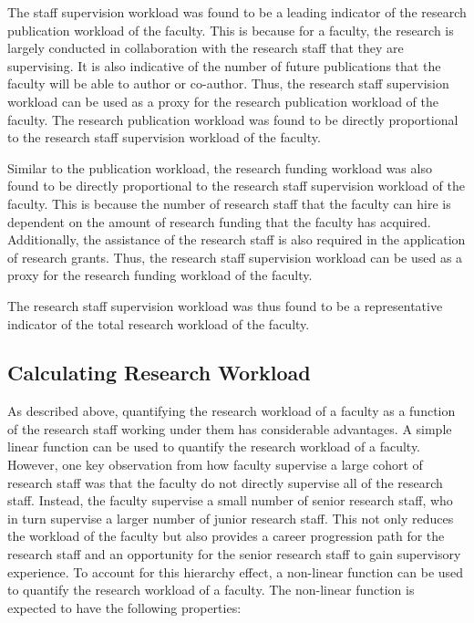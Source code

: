 The staff supervision workload was found to be a leading indicator of the research publication workload of the faculty. This is because for a faculty, the research is largely conducted in collaboration with the research staff that they are supervising. It is also indicative of the number of future publications that the faculty will be able to author or co-author. Thus, the research staff supervision workload can be used as a proxy for the research publication workload of the faculty. The research publication workload was found to be directly proportional to the research staff supervision workload of the faculty.

Similar to the publication workload, the research funding workload was also found to be directly proportional to the research staff supervision workload of the faculty. This is because the number of research staff that the faculty can hire is dependent on the amount of research funding that the faculty has acquired. Additionally, the assistance of the research staff is also required in the application of research grants. Thus, the research staff supervision workload can be used as a proxy for the research funding workload of the faculty.

The research staff supervision workload was thus found to be a representative indicator of the total research workload of the faculty.

\subsection{Calculating Research Workload}
\label{sec:calculating_research_workload}

As described above, quantifying the research workload of a faculty as a function of the research staff working under them has considerable advantages. A simple linear function can be used to quantify the research workload of a faculty. However, one key observation from how faculty supervise a large cohort of research staff was that the faculty do not directly supervise all of the research staff. Instead, the faculty supervise a small number of senior research staff, who in turn supervise a larger number of junior research staff. This not only reduces the workload of the faculty but also provides a career progression path for the research staff and an opportunity for the senior research staff to gain supervisory experience. To account for this hierarchy effect, a non-linear function can be used to quantify the research workload of a faculty. The non-linear function is expected to have the following properties:

